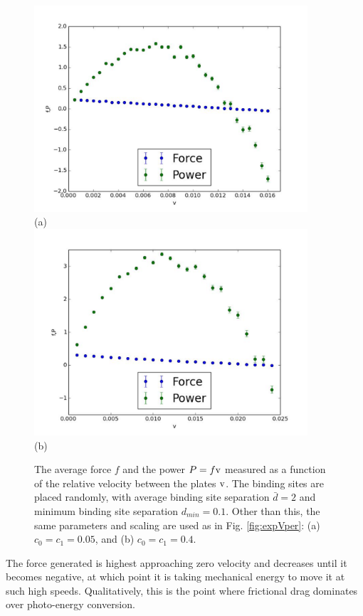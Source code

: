 \documentclass[11pt]{ucthesis}
\begin{document}
\begin{figure}[htp]
\begin{center}
\includegraphics[width=4in]{0505rand}\\
(a)\\
\includegraphics[width=4in]{4040rand}\\
(b)
\caption{
The average force $f$ and the power $P=f {\rm v}$ measured as a function of the relative velocity between the plates $\rm v$. The binding sites are placed randomly, with average binding site separation $\bar d = 2$ and minimum binding site separation $d_{min}=0.1$. Other than this, the same parameters and scaling are used as in Fig. \ref{fig:expVper}: (a) $c_0=c_1= 0.05$, and (b) $c_0=c_1= 0.4$.
}
\label{fig:expVrand}
\end{center}
\end{figure}

The force generated is highest approaching zero velocity and decreases until it
becomes negative, at which point it is taking mechanical energy to move it at
such high speeds. Qualitatively, this is the point where frictional drag
dominates over photo-energy conversion.
\end{document}
